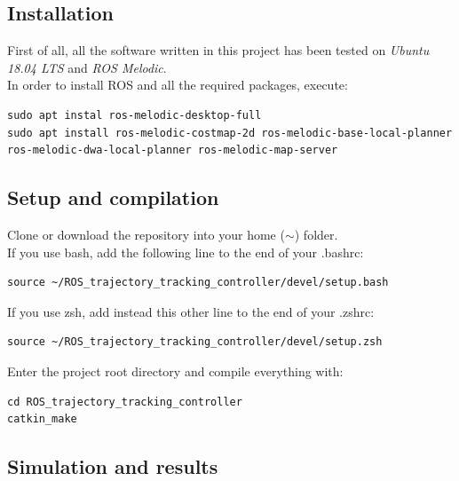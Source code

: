 \documentclass[11pt,a4paper]{article}
\begin{document}

\subsection{Installation}

First of all, all the software written in this project has been tested on \textit{Ubuntu 18.04 LTS}
and \textit{ROS Melodic}.\\

In order to install ROS and all the required packages, execute:

\begin{lstlisting}
sudo apt instal ros-melodic-desktop-full
sudo apt install ros-melodic-costmap-2d ros-melodic-base-local-planner ros-melodic-dwa-local-planner ros-melodic-map-server
\end{lstlisting}



\subsection{Setup and compilation}

Clone or download the repository into your home ($\sim$) folder.\\

If you use bash, add the following line to the end of your .bashrc:
\begin{lstlisting}
source ~/ROS_trajectory_tracking_controller/devel/setup.bash
\end{lstlisting}

If you use zsh, add instead this other line to the end of your .zshrc:
\begin{lstlisting}
source ~/ROS_trajectory_tracking_controller/devel/setup.zsh
\end{lstlisting}

Enter the project root directory and compile everything with:
\begin{lstlisting}
cd ROS_trajectory_tracking_controller
catkin_make
\end{lstlisting}



\subsection{Simulation and results}
\end{document}
